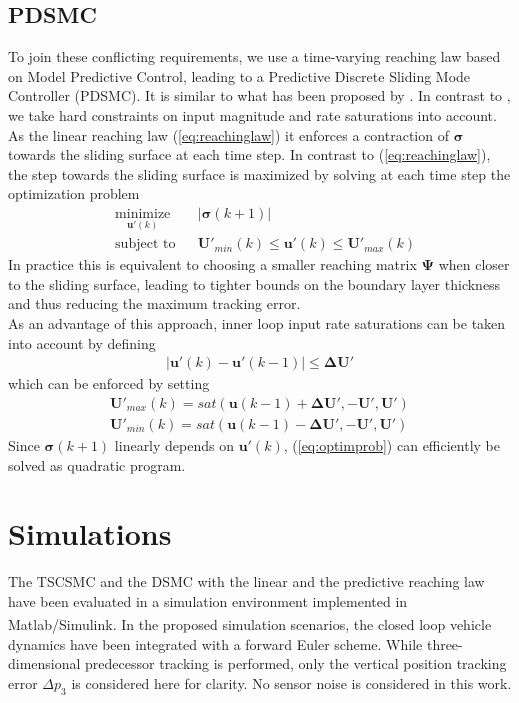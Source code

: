 \documentclass{ifacconf}
\providecommand{\mbf}[1]{\mathbf{#1}}
\newcommand{\idxSample}{{\ensuremath{k}}}
\begin{document}
\subsection{PDSMC}
To join these conflicting requirements, we use a time-varying reaching law based on Model Predictive Control, leading to a Predictive Discrete Sliding Mode Controller (PDSMC). 
It is similar to what has been proposed by \cite{houda2013new}. In contrast to \cite{houda2013new}, we take hard constraints on input magnitude and rate saturations into account.
As the linear reaching law (\ref{eq:reachinglaw}) it enforces a contraction of $\mbf{\sigma}$ towards the sliding surface at each time step. In contrast to (\ref{eq:reachinglaw}), the step towards the sliding surface is maximized by solving at each time step the optimization problem
\begin{align}
& \underset{\mbf{u'}(\idxSample)}{\text{minimize}}
& & |\mbf{\sigma}(\idxSample+1)| 
\label{eq:optimprob} \\
& \text{subject to}
& & \mbf{U}'_{min}(\idxSample) \leq \mbf{u'}(\idxSample) \leq \mbf{U}'_{max}(\idxSample) 
\end{align}
In practice this is equivalent to choosing a smaller reaching matrix $\mbf{\Psi}$ when closer to the sliding surface, leading to tighter bounds on the boundary layer thickness and thus reducing the maximum tracking error.\\
As an advantage of this approach, inner loop input rate saturations can be taken into account by defining 
\begin{align}
|\mbf{u'}(\idxSample) - \mbf{u'}(\idxSample-1)| \leq \mbf{\Delta U}'
\end{align}
which can be enforced by setting
\begin{align}
\mbf{U}'_{max}(\idxSample) = sat(\mbf{u}(\idxSample-1) + \mbf{\Delta U}', -\mbf{U}', \mbf{U}') \\
\mbf{U}'_{min}(\idxSample) = sat(\mbf{u}(\idxSample-1) - \mbf{\Delta U}', -\mbf{U}', \mbf{U}') 
\end{align}
Since $\mbf{\sigma}(\idxSample + 1)$ linearly depends on $\mbf{u}'(\idxSample)$, (\ref{eq:optimprob}) can efficiently be solved as quadratic program.
\section{Simulations}
\label{sec:simulations}
The TSCSMC and the DSMC with the linear and the predictive reaching law have been evaluated in a simulation environment implemented in Matlab\textsuperscript{\tiny \textregistered}/Simulink\textsuperscript{\tiny \textregistered}. In the proposed simulation scenarios, the closed loop vehicle dynamics have been integrated with a forward Euler scheme. While three-dimensional predecessor tracking is performed, only the vertical position tracking error $\Delta p_3$ is considered here for clarity. No sensor noise is considered in this work.
\end{document}
